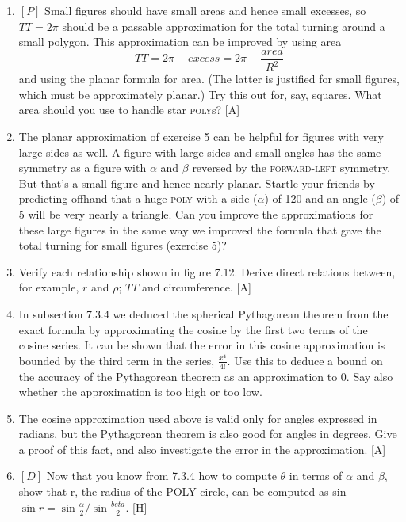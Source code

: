 \documentclass{book}
\begin{document}
\begin{enumerate}
\item $[P]$ Small figures should have small areas and hence small excesses,
so $TT = 2 \pi $ should be a passable approximation for the total turning
around a small polygon. This approximation can be improved by using
area
$$TT = 2 \pi - excess = 2 \pi - \frac{area}{R^2}$$
and using the planar formula for area. (The latter is justified for small
figures, which must be approximately planar.) Try this out for, say,
squares. What area should you use to handle star \textsc{poly}s? [A]

\item The planar approximation of exercise 5 can be helpful for figures with
very large sides as well. A figure with large sides and small angles has the
same symmetry as a figure with $\alpha$ and $\beta$ reversed by the \textsc{forward}-\textsc{left}
symmetry. But that's a small figure and hence nearly planar. Startle
your friends by predicting offhand that a huge \textsc{poly} with a side ($\alpha$) of
120 and an angle ($\beta$) of 5 will be very nearly a triangle. Can you improve
the approximations for these large figures in the same way we improved
the formula that gave the total turning for small figures (exercise 5)?

\item Verify each relationship shown in figure 7.12. Derive direct relations
between, for example, $r$ and $\rho$; $TT$ and circumference. [A]

\item In subsection 7.3.4 we deduced the spherical Pythagorean theorem
from the exact formula by approximating the cosine by the first two
terms of the cosine series. It can be shown that the error in this cosine
approximation is bounded by the third term in the series, $\frac {x^4}{4!}$. Use
this to deduce a bound on the accuracy of the Pythagorean theorem as
an approximation to 0. Say also whether the approximation is too high
or too low.

\item The cosine approximation used above is valid only for angles expressed
in radians, but the Pythagorean theorem is also good for angles in
degrees. Give a proof of this fact, and also investigate the error in the
approximation. [A]

\item $[D]$ Now that you know from 7.3.4 how to compute $\theta$ in terms of $\alpha$
and $\beta$, show that r, the radius of the POLY circle, can be computed as
sin $\sin r = \sin \frac{\alpha}{2} / \sin \frac{beta}{2} $. [H]


\end{enumerate}
\end{document}
